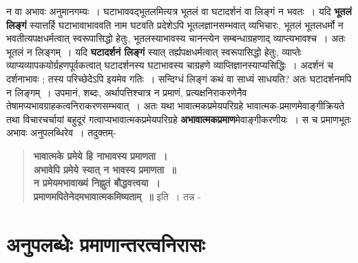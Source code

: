 {\begin{verse}
\end{verse}  
न वा अभावः अनुमानगम्यः~। घटाभाववद्भूतलमित्यत्र भूतलं वा घटादर्शनं वा लिङ्गं न भवतः~। यदि \textbf{भूतलं लिङ्गं} स्यात्तर्हि घटाभावाभाववति नाम घटवति प्रदेशेऽपि भूतलज्ञानसम्भवात् व्यभिचारः, भूतलं भूतलधर्मो न भवतीत्यपक्षधर्मत्वात् स्वरूपासिद्धो हेतुः, भूतलस्याभावस्य चानन्त्येन सम्बन्धाग्रहणाद् व्याप्त्यभावश्च~। अतः भूतलं न लिङ्गम्~।  यदि \textbf{घटादर्शनं लिङ्गं} स्यात् तर्ह्यपक्षधर्मत्वात् स्वरूपासिद्धो हेतुः, व्याप्तेः व्याप्यव्यापकयोर्ग्रहणपूर्वकत्वात् घटादर्शनस्य घटाभावस्य चाग्रहणे व्याप्तिज्ञानस्याप्यसिद्धिः~। अदर्शनं च दर्शनाभावः ; तस्य परिच्छेदेऽपि इयमेव गतिः~। सन्दिग्धं लिङ्गं कथं वा साध्यं साधयति? अतः घटादर्शनमपि न लिङ्गम्~। उपमानं, शब्दः, अर्थापत्तिश्चात्र न प्रमाणं, प्रत्यक्षनिराकरणेनैव तेषामप्यभावग्राहकत्वनिराकरणसम्भवात्~। अतः यथा भावात्मकप्रमेयपरिग्रहे भावात्मक-प्रमाणमेवाङ्गीक्रियते तथा विचारचर्चायां बहुदूरं गत्वाप्यभावात्मकप्रमेयपरिग्रहे \textbf{अभावात्मकप्रमाण}मेवाङ्गीकरणीयः~। स च प्रमाणभूतः अभावः अनुपलब्धिरेव~। तदुक्तम्-
\begin{verse}
\textbf{भावात्मके प्रमेये हि नाभावस्य प्रमाणता~। \\
अभावेपि प्रमेये स्यात् न भावस्य प्रमाणता~॥\\
न प्रमेयमभावाख्यं निह्नुतं बौद्धवत्त्वया~। \\
प्रमाणमपितेनेदमभावात्मकमिष्यताम्~॥} इति~। तन्न -
\end{verse}

\section*{अनुपलब्धेः प्रमाणान्तरत्वनिरासः} 

}
